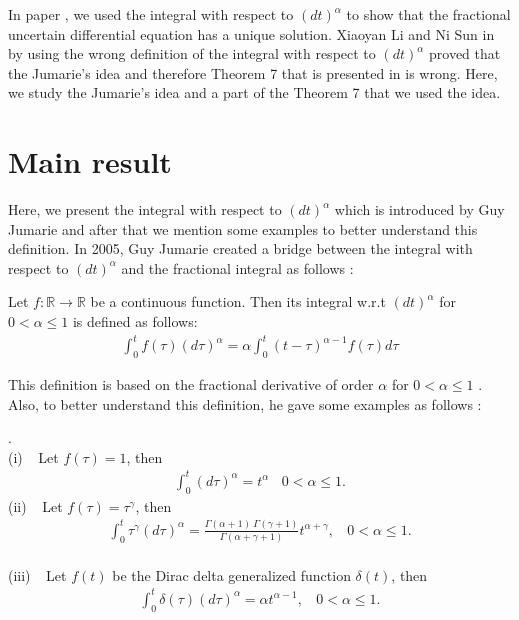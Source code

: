 \documentclass[a4paper,fleqn]{cas-dc}
\begin{document}
	
	
	In paper \cite{bib 2}, we used the integral with respect to $ (dt)^{\alpha}$  to show that the fractional uncertain differential equation has a unique solution.   Xiaoyan Li and Ni Sun in \cite{bib 1} by using the wrong definition of the  integral with respect to $ (dt)^{\alpha}$ proved that the Jumarie's idea and therefore  Theorem  7 that is  presented in \cite{bib 2} is wrong. Here, we study the Jumarie's idea and  a part of the   Theorem  7 that we used the idea. 
	
	
	
	
	
	\section{Main result}
	Here, we  present the integral with respect to $ (dt)^{\alpha}$ which is introduced by  Guy Jumarie and after that we mention some examples to better understand this definition.  In 2005,  Guy Jumarie created a bridge between the  integral with respect to $ (dt)^{\alpha}$ and the fractional integral as follows : 
	\begin{definition}\label{def 1}
		Let $f : \mathbb{R} \longrightarrow \mathbb{R}$ be a continuous function. Then its integral w.r.t $(dt)^{\alpha}$ for $0 < \alpha \leq 1$ is defined as follows:
		\begin{align}\label{eq 11}
			\int_0^t f(\tau) (d\tau)^{\alpha} = \alpha \int_0^t (t - \tau)^{\alpha -1}f(\tau)  d\tau
		\end{align}
	\end{definition}
	This definition is based on the  fractional derivative of order $\alpha$ for $0 < \alpha \leq 1$ \cite{bib 3}. Also, to better understand this definition, he gave some examples as follows \cite{bib 3, bib 4}:
	\begin{example}
		.
		\\
		(i) $~~$ Let $f(\tau) = 1$, then 
		\begin{align}
			\int_0^t  (d\tau)^{\alpha} = t^{\alpha} ~~~~ 0 < \alpha \leq 1.
		\end{align}
		(ii) $~~$ Let $f(\tau) =\tau^{\gamma}$, then 
		\begin{align}
			\int_0^t \tau^{\gamma} (d\tau)^{\alpha} = \frac{\Gamma(\alpha + 1) ~ \Gamma(\gamma + 1)}{\Gamma(\alpha + \gamma + 1)} t^{\alpha + \gamma}, ~~~~ 0 < \alpha \leq 1.
		\end{align}
		\\
		(iii) $~~$ Let $f(t)$ be  the Dirac delta generalized function $\delta (t)$, then 
		\begin{align}
			\int_0^t \delta (\tau) (d\tau)^{\alpha} = \alpha t^{\alpha -1}, ~~~~ 0 < \alpha \leq 1.
		\end{align}
	\end{example}
\end{document}
